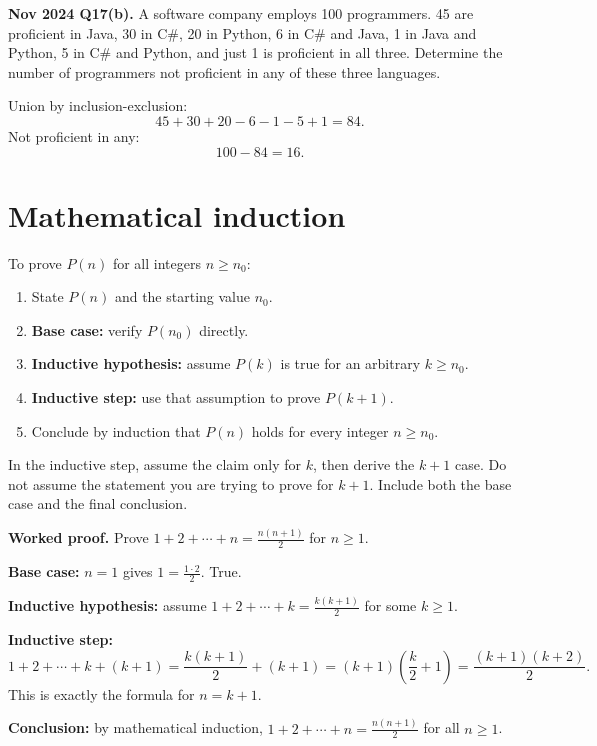 \documentclass[11pt,a4paper]{article}
\begin{document}
\begin{pyqbox}
\textbf{Nov 2024 Q17(b).} A software company employs 100 programmers. 45 are proficient in Java, 30 in C\#, 20 in Python, 6 in C\# and Java, 1 in Java and Python, 5 in C\# and Python, and just 1 is proficient in all three. Determine the number of programmers not proficient in any of these three languages.
\end{pyqbox}

\begin{solbox}
Union by inclusion-exclusion:
\[
45+30+20-6-1-5+1=84.
\]
Not proficient in any:
\[
100-84=\boxed{16}.
\]
\end{solbox}

\section{Mathematical induction}

To prove $P(n)$ for all integers $n\ge n_0$:
\begin{enumerate}
\item State $P(n)$ and the starting value $n_0$.
\item \textbf{Base case:} verify $P(n_0)$ directly.
\item \textbf{Inductive hypothesis:} assume $P(k)$ is true for an arbitrary $k\ge n_0$.
\item \textbf{Inductive step:} use that assumption to prove $P(k+1)$.
\item Conclude by induction that $P(n)$ holds for every integer $n\ge n_0$.
\end{enumerate}

\begin{dangerbox}
In the inductive step, assume the claim only for $k$, then derive the $k+1$ case. Do not assume the statement you are trying to prove for $k+1$. Include both the base case and the final conclusion.
\end{dangerbox}

\begin{exambox}
\textbf{Worked proof.} Prove $1+2+\cdots+n=\frac{n(n+1)}2$ for $n\ge1$.

\textbf{Base case:} $n=1$ gives $1=\frac{1\cdot2}{2}$. True.

\textbf{Inductive hypothesis:} assume $1+2+\cdots+k=\frac{k(k+1)}2$ for some $k\ge1$.

\textbf{Inductive step:}
\[
1+2+\cdots+k+(k+1)=\frac{k(k+1)}2+(k+1)
=(k+1)\left(\frac{k}{2}+1\right)=\frac{(k+1)(k+2)}2.
\]
This is exactly the formula for $n=k+1$.

\textbf{Conclusion:} by mathematical induction, $1+2+\cdots+n=\frac{n(n+1)}2$ for all $n\ge1$.
\end{exambox}
\end{document}

